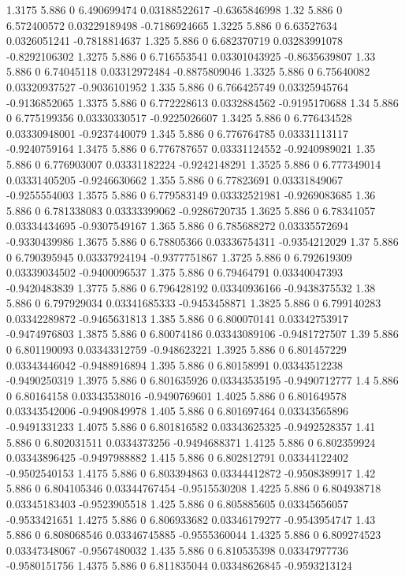 {1.3175 5.886 0 6.490699474 0.03188522617 -0.6365846998
1.32 5.886 0 6.572400572 0.03229189498 -0.7186924665
1.3225 5.886 0 6.63527634 0.0326051241 -0.7818814637
1.325 5.886 0 6.682370719 0.03283991078 -0.8292106302
1.3275 5.886 0 6.716553541 0.03301043925 -0.8635639807
1.33 5.886 0 6.74045118 0.03312972484 -0.8875809046
1.3325 5.886 0 6.75640082 0.03320937527 -0.9036101952
1.335 5.886 0 6.766425749 0.03325945764 -0.9136852065
1.3375 5.886 0 6.772228613 0.0332884562 -0.9195170688
1.34 5.886 0 6.775199356 0.03330330517 -0.9225026607
1.3425 5.886 0 6.776434528 0.03330948001 -0.9237440079
1.345 5.886 0 6.776764785 0.03331113117 -0.9240759164
1.3475 5.886 0 6.776787657 0.03331124552 -0.9240989021
1.35 5.886 0 6.776903007 0.03331182224 -0.9242148291
1.3525 5.886 0 6.777349014 0.03331405205 -0.9246630662
1.355 5.886 0 6.77823691 0.03331849067 -0.9255554003
1.3575 5.886 0 6.779583149 0.03332521981 -0.9269083685
1.36 5.886 0 6.781338083 0.03333399062 -0.9286720735
1.3625 5.886 0 6.78341057 0.03334434695 -0.9307549167
1.365 5.886 0 6.785688272 0.03335572694 -0.9330439986
1.3675 5.886 0 6.78805366 0.03336754311 -0.9354212029
1.37 5.886 0 6.790395945 0.03337924194 -0.9377751867
1.3725 5.886 0 6.792619309 0.03339034502 -0.9400096537
1.375 5.886 0 6.79464791 0.03340047393 -0.9420483839
1.3775 5.886 0 6.796428192 0.03340936166 -0.9438375532
1.38 5.886 0 6.797929034 0.03341685333 -0.9453458871
1.3825 5.886 0 6.799140283 0.03342289872 -0.9465631813
1.385 5.886 0 6.800070141 0.03342753917 -0.9474976803
1.3875 5.886 0 6.80074186 0.03343089106 -0.9481727507
1.39 5.886 0 6.801190093 0.03343312759 -0.948623221
1.3925 5.886 0 6.801457229 0.03343446042 -0.9488916894
1.395 5.886 0 6.80158991 0.03343512238 -0.9490250319
1.3975 5.886 0 6.801635926 0.03343535195 -0.9490712777
1.4 5.886 0 6.80164158 0.03343538016 -0.9490769601
1.4025 5.886 0 6.801649578 0.03343542006 -0.9490849978
1.405 5.886 0 6.801697464 0.03343565896 -0.9491331233
1.4075 5.886 0 6.801816582 0.03343625325 -0.9492528357
1.41 5.886 0 6.802031511 0.0334373256 -0.9494688371
1.4125 5.886 0 6.802359924 0.03343896425 -0.9497988882
1.415 5.886 0 6.802812791 0.03344122402 -0.9502540153
1.4175 5.886 0 6.803394863 0.03344412872 -0.9508389917
1.42 5.886 0 6.804105346 0.03344767454 -0.9515530208
1.4225 5.886 0 6.804938718 0.03345183403 -0.9523905518
1.425 5.886 0 6.805885605 0.03345656057 -0.9533421651
1.4275 5.886 0 6.806933682 0.03346179277 -0.9543954747
1.43 5.886 0 6.808068546 0.03346745885 -0.9555360044
1.4325 5.886 0 6.809274523 0.03347348067 -0.9567480032
1.435 5.886 0 6.810535398 0.03347977736 -0.9580151756
1.4375 5.886 0 6.811835044 0.03348626845 -0.9593213124
}
